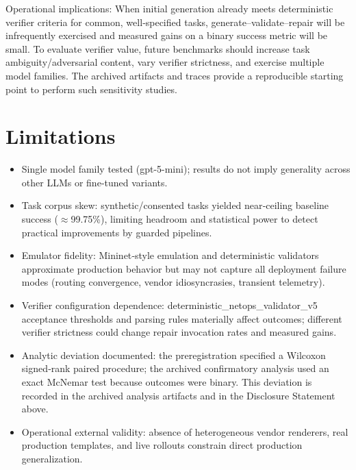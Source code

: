 \documentclass[conference]{IEEEtran}
\begin{document}
Operational implications: When initial generation already meets deterministic verifier criteria for common, well‑specified tasks, generate--validate--repair will be infrequently exercised and measured gains on a binary success metric will be small. To evaluate verifier value, future benchmarks should increase task ambiguity/adversarial content, vary verifier strictness, and exercise multiple model families. The archived artifacts and traces provide a reproducible starting point to perform such sensitivity studies.

\section{Limitations}
\begin{itemize}
\item Single model family tested (gpt-5-mini); results do not imply generality across other LLMs or fine‑tuned variants.
\item Task corpus skew: synthetic/consented tasks yielded near‑ceiling baseline success (\ensuremath{\approx}99.75\%), limiting headroom and statistical power to detect practical improvements by guarded pipelines.
\item Emulator fidelity: Mininet‑style emulation and deterministic validators approximate production behavior but may not capture all deployment failure modes (routing convergence, vendor idiosyncrasies, transient telemetry).
\item Verifier configuration dependence: deterministic\_netops\_validator\_v5 acceptance thresholds and parsing rules materially affect outcomes; different verifier strictness could change repair invocation rates and measured gains.
\item Analytic deviation documented: the preregistration specified a Wilcoxon signed‑rank paired procedure; the archived confirmatory analysis used an exact McNemar test because outcomes were binary. This deviation is recorded in the archived analysis artifacts and in the Disclosure Statement above.
\item Operational external validity: absence of heterogeneous vendor renderers, real production templates, and live rollouts constrain direct production generalization.
\end{itemize}
\end{document}
